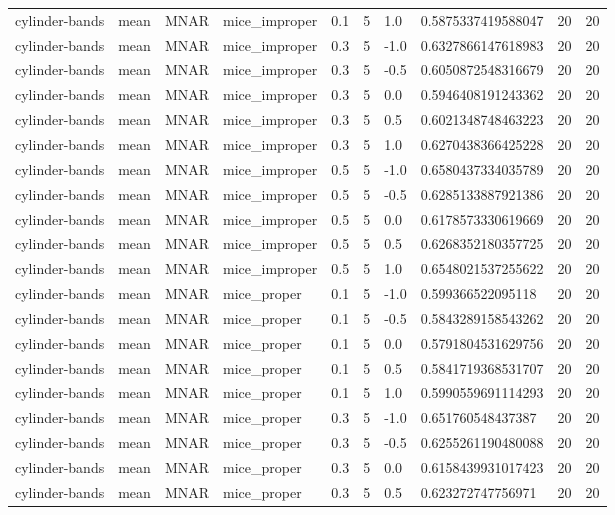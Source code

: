 \begin{tabular}{llllllllll}
cylinder-bands & mean & MNAR & mice\_improper & 0.1 & 5 & 1.0 & 0.5875337419588047 & 20 & 20 \\
cylinder-bands & mean & MNAR & mice\_improper & 0.3 & 5 & -1.0 & 0.6327866147618983 & 20 & 20 \\
cylinder-bands & mean & MNAR & mice\_improper & 0.3 & 5 & -0.5 & 0.6050872548316679 & 20 & 20 \\
cylinder-bands & mean & MNAR & mice\_improper & 0.3 & 5 & 0.0 & 0.5946408191243362 & 20 & 20 \\
cylinder-bands & mean & MNAR & mice\_improper & 0.3 & 5 & 0.5 & 0.6021348748463223 & 20 & 20 \\
cylinder-bands & mean & MNAR & mice\_improper & 0.3 & 5 & 1.0 & 0.6270438366425228 & 20 & 20 \\
cylinder-bands & mean & MNAR & mice\_improper & 0.5 & 5 & -1.0 & 0.6580437334035789 & 20 & 20 \\
cylinder-bands & mean & MNAR & mice\_improper & 0.5 & 5 & -0.5 & 0.6285133887921386 & 20 & 20 \\
cylinder-bands & mean & MNAR & mice\_improper & 0.5 & 5 & 0.0 & 0.6178573330619669 & 20 & 20 \\
cylinder-bands & mean & MNAR & mice\_improper & 0.5 & 5 & 0.5 & 0.6268352180357725 & 20 & 20 \\
cylinder-bands & mean & MNAR & mice\_improper & 0.5 & 5 & 1.0 & 0.6548021537255622 & 20 & 20 \\
cylinder-bands & mean & MNAR & mice\_proper & 0.1 & 5 & -1.0 & 0.599366522095118 & 20 & 20 \\
cylinder-bands & mean & MNAR & mice\_proper & 0.1 & 5 & -0.5 & 0.5843289158543262 & 20 & 20 \\
cylinder-bands & mean & MNAR & mice\_proper & 0.1 & 5 & 0.0 & 0.5791804531629756 & 20 & 20 \\
cylinder-bands & mean & MNAR & mice\_proper & 0.1 & 5 & 0.5 & 0.5841719368531707 & 20 & 20 \\
cylinder-bands & mean & MNAR & mice\_proper & 0.1 & 5 & 1.0 & 0.5990559691114293 & 20 & 20 \\
cylinder-bands & mean & MNAR & mice\_proper & 0.3 & 5 & -1.0 & 0.651760548437387 & 20 & 20 \\
cylinder-bands & mean & MNAR & mice\_proper & 0.3 & 5 & -0.5 & 0.6255261190480088 & 20 & 20 \\
cylinder-bands & mean & MNAR & mice\_proper & 0.3 & 5 & 0.0 & 0.6158439931017423 & 20 & 20 \\
cylinder-bands & mean & MNAR & mice\_proper & 0.3 & 5 & 0.5 & 0.623272747756971 & 20 & 20 \\

\end{tabular}

